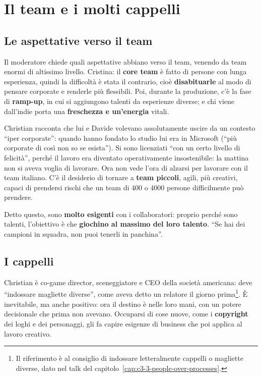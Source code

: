 \section{Il team e i molti cappelli}
\label{sec:c3-4-cappelli}

\subsection{Le aspettative verso il team}

Il moderatore chiede quali aspettative abbiano verso il team, venendo da team
enormi di altissimo livello. Cristina: il \textbf{core team} è fatto di persone con
lunga esperienza, quindi la difficoltà è stata il contrario, cioè
\textbf{disabituarle} al modo di pensare corporate e renderle più flessibili. Poi,
durante la produzione, c'è la fase di \textbf{ramp-up}, in cui si aggiungono talenti
da esperienze diverse; e chi viene dall'indie porta una \textbf{freschezza e
un'energia} vitali.

Christian racconta che lui e Davide volevano assolutamente uscire da un contesto
``iper corporate'': quando hanno fondato lo studio lui era in Microsoft (``più
corporate di così non so se esista''). Si sono licenziati ``con un certo livello di
felicità'', perché il lavoro era diventato operativamente insostenibile: la mattina
non si aveva voglia di lavorare. Ora non vede l'ora di alzarsi per lavorare con il
team italiano. C'è il desiderio di tornare a \textbf{team piccoli}, agili, più
creativi, capaci di prendersi rischi che un team di 400 o 4000 persone difficilmente
può prendere.

Detto questo, sono \textbf{molto esigenti} con i collaboratori: proprio perché sono
talenti, l'obiettivo è che \textbf{giochino al massimo del loro talento}. ``Se hai
dei campioni in squadra, non puoi tenerli in panchina''.

\subsection{I cappelli}

Christian è co-game director, sceneggiatore e CEO della società americana: deve
``indossare magliette diverse'', come aveva detto un relatore il giorno
prima\footnote{Il riferimento è al consiglio di indossare letteralmente cappelli o
magliette diverse, dato nel talk del capitolo~\ref{cap:c3-3-people-over-processes}.}.
È inevitabile, ma anche positivo: ora il destino è nelle loro mani, con un potere
decisionale che prima non avevano. Occuparsi di cose nuove, come i
\textbf{copyright} dei loghi e dei personaggi, gli fa capire esigenze di business
che poi applica al lavoro creativo.

